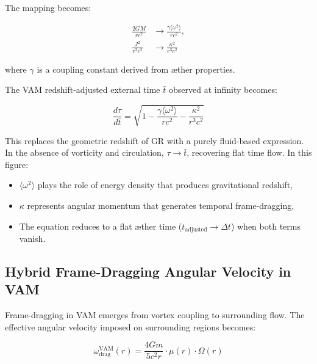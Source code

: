 The mapping becomes:

\begin{equation}
    \begin{aligned}
        \frac{2GM}{rc^2} &\rightarrow \frac{\gamma \langle \omega^2 \rangle}{r c^2}, \\
        \frac{J^2}{r^3 c^2} &\rightarrow \frac{\kappa^2}{r^3 c^2}
    \end{aligned}
    \label{eq:Kerr_replacements}
\end{equation}

\noindent where \( \gamma \) is a coupling constant derived from æther properties.

The VAM redshift-adjusted external time \( \bar{t} \) observed at infinity becomes:

\begin{equation}
    \boxed{
        \frac{d\tau}{d\bar{t}} = \sqrt{1 - \frac{\gamma \langle \omega^2 \rangle}{r c^2} - \frac{\kappa^2}{r^3 c^2}}
    }
    \label{eq:Kerr_time_dilation_ae}
\end{equation}

This replaces the geometric redshift of GR with a purely fluid-based expression. In the absence of vorticity and circulation, \( \tau \to \bar{t} \), recovering flat time flow. In this figure:
\begin{itemize}
    \item $\langle \omega^2 \rangle$ plays the role of energy density that produces gravitational redshift,
    \item $\kappa$ represents angular momentum that generates temporal frame-dragging,
    \item The equation reduces to a flat æther time ($t_\text{adjusted} \to \Delta t$) when both terms vanish.

\end{itemize}

\subsection*{Hybrid Frame-Dragging Angular Velocity in VAM}

Frame-dragging in VAM emerges from vortex coupling to surrounding flow. The effective angular velocity imposed on surrounding regions becomes:

\begin{equation}
    \omega_\text{drag}^\text{VAM}(r) =
    \frac{4 G m}{5 c^2 r} \cdot \mu(r) \cdot \Omega(r)
\end{equation}

